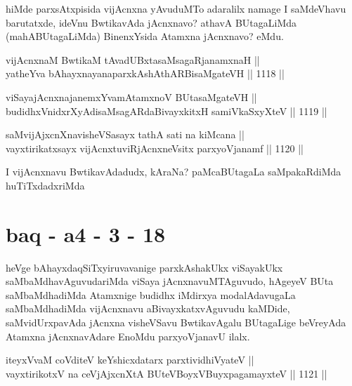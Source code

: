 \begin{artha}
hiMde parxsAtxpisida vijAcnxna yAvuduMTo adaralilx namage I saMdeVhavu barutatxde, ideVnu BwtikavAda jAcnxnavo? athavA BUtagaLiMda (mahABUtagaLiMda) BinenxYsida Atamxna jAcnxnavo? eMdu.
\end{artha}


\begin{shl}
vijAcnxnaM BwtikaM tAvadUBxtasaMsagaRjanamxnaH || \\
yatheYva bAhayxnayanaparxkAshAthARBisaMgateVH \hfill || 1118 ||  
\end{shl}
				
\begin{shl}
viSayajAcnxnajanemxYvamAtamxnoV BUtasaMgateVH || \\
budidhxVnidxrXyAdisaMsagARdaBivayxkitxH samiVkaSxyXteV \hfill || 1119 || 
\end{shl}
				
\begin{shl}
saMvijAjxcnXnavisheVSasayx tathA sati na kiMcana || \\
vayxtirikatxsayx vijAcnxtuviRjAcnxneV\s sitx parxyoVjanamf \hfill || 1120 ||  
\end{shl}

\begin{artha}
I vijAcnxnavu BwtikavAdadudx, kAraNa? paMcaBUtagaLa saMpakaRdiMda huTiTxdadxriMda
\end{artha}

\section*{baq - a4 - 3 - 18}


\begin{artha}
heVge bAhayxdaqSiTxyiruvavanige parxkAshakUkx viSayakUkx saMbaMdhavAguvudariMda viSaya jAcnxnavuMTAguvudo, hAgeyeV BUta saMbaMdhadiMda Atamxnige budidhx iMdirxya modalAdavugaLa saMbaMdhadiMda vijAcnxnavu aBivayxkatxvAguvudu kaMDide, saMvidUrxpavAda jAcnxna visheVSavu BwtikavAgalu BUtagaLige beVreyAda Atamxna jAcnxnavAdare EnoMdu parxyoVjanavU ilalx.
\end{artha}


\begin{shl}
iteyxVvaM coVditeV keYshicxdatarx parxtividhiVyateV || \\
vayxtirikotxV na ceVjAjxcnXtA BUteVBoyxV\s BuyxpagamayxteV \hfill || 1121 ||  
\end{shl}

